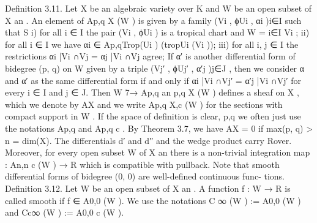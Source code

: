 \documentclass[
  10pt,
]{article}
\newenvironment{Shaded}{}{}
\newcommand{\NormalTok}[1]{#1}
\begin{document}
\begin{Shaded}
\begin{Highlighting}[]
\NormalTok{Definition 3.11. Let X be an algebraic variety over K and W be an open subset of}
\NormalTok{X an . An element of Ap,q   X (W ) is given by a family (Vi , ϕUi , αi )i∈I such that}
\NormalTok{                                                                             S}
\NormalTok{       i) for all i ∈ I the pair (Vi , ϕUi ) is a tropical chart and W = i∈I Vi ;}
\NormalTok{      ii) for all i ∈ I we have αi ∈ Ap,qTrop(Ui ) (tropUi (Vi ));}
\NormalTok{     iii) for all i, j ∈ I the restrictions αi |Vi ∩Vj = αj |Vi ∩Vj agree;}
\NormalTok{   If α′ is another differential form of bidegree (p, q) on W given by a triple (Vj′ , ϕUj′ , α′j )j∈J ,}
\NormalTok{then we consider α and α′ as the same differential form if and only if}
\NormalTok{                                         αi |Vi ∩Vj′ = α′j |Vi ∩Vj′}
\NormalTok{for every i ∈ I and j ∈ J.}
\NormalTok{   Then W 7→ Ap,q                              an                          p,q}
\NormalTok{                   X (W ) defines a sheaf on X , which we denote by AX and we write}
\NormalTok{Ap,q}
\NormalTok{  X,c (W ) for the sections with compact support in W . If the space of definition is clear,}
\NormalTok{                                                                                  p,q}
\NormalTok{we often just use the notations Ap,q and Ap,q c . By Theorem 3.7, we have AX = 0 if}
\NormalTok{max(p, q) \textgreater{} n = dim(X).}
\NormalTok{   The differentials d′ and d′′ and the wedge product carry Rover. Moreover, for every}
\NormalTok{open subset W of X an there is a non{-}trivial integration map : An,n   c (W ) → R which is}
\NormalTok{compatible with pullback.}
\NormalTok{   Note that smooth differential forms of bidegree (0, 0) are well{-}defined continuous func{-}}
\NormalTok{tions.}
\NormalTok{Definition 3.12. Let W be an open subset of X an . A function f : W → R is called}
\NormalTok{smooth if f ∈ A0,0 (W ). We use the notations C ∞ (W ) := A0,0 (W ) and Cc∞ (W ) :=}
\NormalTok{A0,0}
\NormalTok{ c (W ).}


\end{Highlighting}
\end{Shaded}
\end{document}
